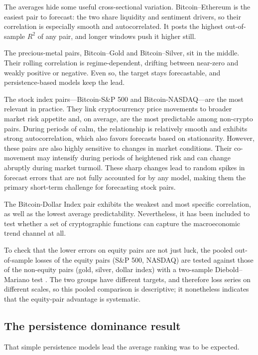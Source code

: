 The averages hide some useful cross-sectional variation. Bitcoin--Ethereum is the easiest pair to forecast: the two share liquidity and sentiment drivers, so their correlation is especially smooth and autocorrelated. It posts the highest out-of-sample $R^2$ of any pair, and longer windows push it higher still.

The precious-metal pairs, Bitcoin--Gold and Bitcoin--Silver, sit in the middle. Their rolling correlation is regime-dependent, drifting between near-zero and weakly positive or negative. Even so, the target stays forecastable, and persistence-based models keep the lead.

The stock index pairs—Bitcoin-S\&P 500 and Bitcoin-NASDAQ—are the most relevant in practice. They link cryptocurrency price movements to broader market risk appetite and, on average, are the most predictable among non-crypto pairs. During periods of calm, the relationship is relatively smooth and exhibits strong autocorrelation, which also favors forecasts based on stationarity. However, these pairs are also highly sensitive to changes in market conditions. Their co-movement may intensify during periods of heightened risk and can change abruptly during market turmoil. These sharp changes lead to random spikes in forecast errors that are not fully accounted for by any model, making them the primary short-term challenge for forecasting stock pairs.

The Bitcoin-Dollar Index pair exhibits the weakest and most specific correlation, as well as the lowest average predictability. Nevertheless, it has been included to test whether a set of cryptographic functions can capture the macroeconomic trend channel at all.

To check that the lower errors on equity pairs are not just luck, the pooled out-of-sample losses of the equity pairs (S\&P 500, NASDAQ) are tested against those of the non-equity pairs (gold, silver, dollar index) with a two-sample Diebold--Mariano test \cite{diebold1995}. The two groups have different targets, and therefore loss series on different scales, so this pooled comparison is descriptive; it nonetheless indicates that the equity-pair advantage is systematic.

\subsection{The persistence dominance result}

That simple persistence models lead the average ranking was to be expected.

